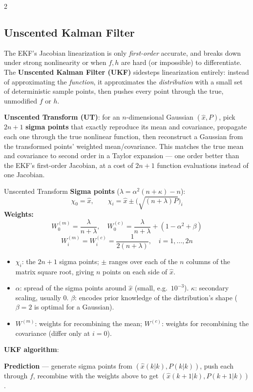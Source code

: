 \documentclass[10pt,a4paper]{article}
\newcommand{\keyterm}[1]{\textbf{#1}}
\begin{document}
\begin{multicols}{2}
\subsection{Unscented Kalman Filter}
The EKF's Jacobian linearization is only \emph{first-order} accurate, and breaks down under strong nonlinearity or when $f,h$ are hard (or impossible) to differentiate. The \keyterm{Unscented Kalman Filter (UKF)} sidesteps linearization entirely: instead of approximating the \emph{function}, it approximates the \emph{distribution} with a small set of deterministic sample points, then pushes every point through the true, unmodified $f$ or $h$.

\keyterm{Unscented Transform (UT)}: for an $n$-dimensional Gaussian $(\hat x,P)$, pick $2n{+}1$ \keyterm{sigma points} that exactly reproduce its mean and covariance, propagate each one through the true nonlinear function, then reconstruct a Gaussian from the transformed points' weighted mean/covariance. This matches the true mean and covariance to second order in a Taylor expansion --- one order better than the EKF's first-order Jacobian, at a cost of $2n{+}1$ function evaluations instead of one Jacobian.

\begin{defbox}{Unscented Transform}
\textbf{Sigma points} ($\lambda=\alpha^2(n{+}\kappa)-n$):
\[
\chi_0=\hat x,\qquad \chi_i=\hat x\pm\Big(\sqrt{(n{+}\lambda)P}\Big)_i
\]
\textbf{Weights:}
\[
W_0^{(m)}=\frac{\lambda}{n+\lambda},\quad W_0^{(c)}=\frac{\lambda}{n+\lambda}+(1{-}\alpha^2{+}\beta)
\]
\[
W_i^{(m)}=W_i^{(c)}=\frac{1}{2(n+\lambda)},\quad i=1,\dots,2n
\]
\end{defbox}
\begin{itemize}
\item $\chi_i$: the $2n{+}1$ sigma points; $\pm$ ranges over each of the $n$ columns of the matrix square root, giving $n$ points on each side of $\hat x$.
\item $\alpha$: spread of the sigma points around $\hat x$ (small, e.g.\ $10^{-3}$). $\kappa$: secondary scaling, usually $0$. $\beta$: encodes prior knowledge of the distribution's shape ($\beta{=}2$ is optimal for a Gaussian).
\item $W^{(m)}$: weights for recombining the mean; $W^{(c)}$: weights for recombining the covariance (differ only at $i{=}0$).
\end{itemize}

\keyterm{UKF algorithm}: 

\textbf{Prediction} --- generate sigma points from $(\hat x(k|k),P(k|k))$, push each through $f$, recombine with the weights above to get $(\hat x(k{+}1|k),P(k{+}1|k))$. 


\end{multicols}
\end{document}
